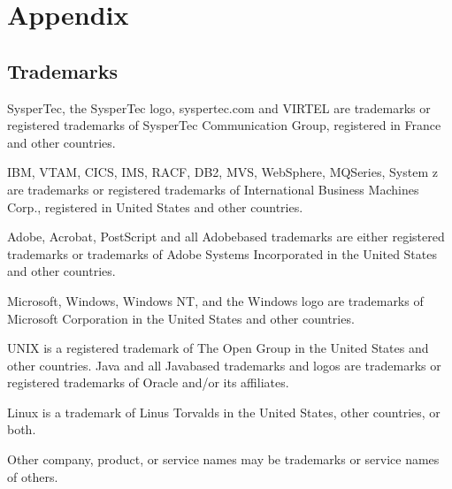 \documentclass[letterpaper,10pt,english]{sphinxmanual}
\begin{document}
\chapter{Appendix}
\label{\detokenize{Getting_Started:appendix}}

\section{Trademarks}
\label{\detokenize{Getting_Started:trademarks}}
\sphinxAtStartPar
SysperTec, the SysperTec logo, syspertec.com and VIRTEL are trademarks or registered trademarks of SysperTec
Communication Group, registered in France and other countries.

\sphinxAtStartPar
IBM, VTAM, CICS, IMS, RACF, DB2, MVS, WebSphere, MQSeries, System z are trademarks or registered trademarks of
International Business Machines Corp., registered in United States and other countries.

\sphinxAtStartPar
Adobe, Acrobat, PostScript and all Adobe\sphinxhyphen{}based trademarks are either registered trademarks or trademarks of Adobe
Systems Incorporated in the United States and other countries.

\sphinxAtStartPar
Microsoft, Windows, Windows NT, and the Windows logo are trademarks of Microsoft Corporation in the United States
and other countries.

\sphinxAtStartPar
UNIX is a registered trademark of The Open Group in the United States and other countries.
Java and all Java\sphinxhyphen{}based trademarks and logos are trademarks or registered trademarks of Oracle and/or its affiliates.

\sphinxAtStartPar
Linux is a trademark of Linus Torvalds in the United States, other countries, or both.

\sphinxAtStartPar
Other company, product, or service names may be trademarks or service names of others.
\end{document}
